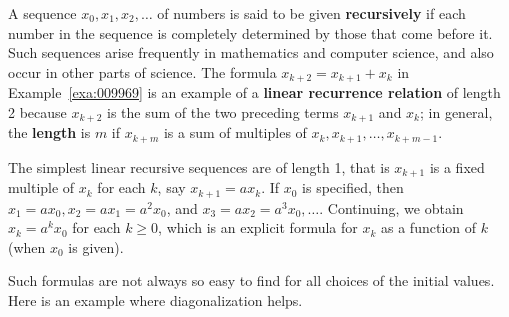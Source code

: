 A sequence $x_{0}, x_{1}, x_{2}, \dots$  of numbers is said to be given \textbf{recursively}
 if each number in the sequence is completely determined by those that 
come before it. Such sequences arise frequently in mathematics and 
computer science, and also occur in other parts of science. The formula $x_{k+2} = x_{k+1} + x_{k}$ in Example~\ref{exa:009969} is an example of a \textbf{linear recurrence relation} of length 2 because $x_{k+2}$ is the sum of the two preceding terms $x_{k+1}$ and $x_{k}$; in general, the \textbf{length} is $m$ if $x_{k+m}$ is a sum of multiples of $x_{k}, x_{k+1}, \dots , x_{k+m-1}$.


The simplest linear recursive sequences are of length 1, that is $x_{k+1}$ is a fixed multiple of $x_{k}$ for each $k$, say $x_{k+1} = ax_{k}$. If $x_{0}$ is specified, then $x_{1} = ax_{0}, x_{2} = ax_{1} = a^{2}x_{0}$, and $x_{3} = ax_{2} = a^{3}x_{0}, \dots$. Continuing, we obtain $x_{k} = a^{k}x_{0}$ for each $k \geq 0$, which is an explicit formula for $x_{k}$ as a function of $k$ (when $x_{0}$ is given).


Such formulas are not always so easy to
 find for all choices of the initial values. Here is an example where 
diagonalization helps.



